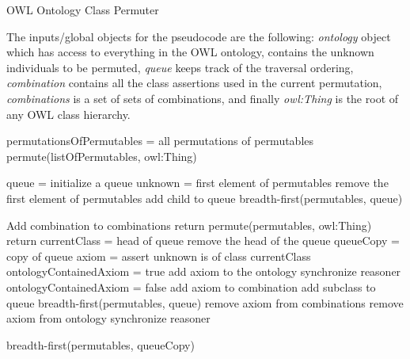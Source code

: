 \documentclass{article}
\begin{document}
\begin{algorithm}
\caption{OWL Ontology Class Permuter}
\State The inputs/global objects for the pseudocode are the following:
\emph{ontology} object which has access to everything
in the OWL ontology,  contains the unknown individuals to be permuted,
\emph{queue} keeps track of the traversal ordering,
\emph{combination} contains all the class assertions
used in the current permutation, \emph{combinations} is a set of sets of
combinations, and finally \emph{owl:Thing} is the root of any OWL class hierarchy.
\begin{algorithmic}[0]
  \State
  \State permutationsOfPermutables = all permutations of permutables
    \State permute(listOfPermutables, owl:Thing)
  \EndFor
  \State
\EndProcedure

  \State queue = initialize a queue
  \State unknown = first element of permutables
  \State remove the first element of permutables
    \State add child to queue
  \EndFor
  \State breadth-first(permutables, queue)
  \State
\EndProcedure

      \State Add combination to combinations
    \EndIf
    \State return
    \State permute(permutables, owl:Thing)
    \State return
  \EndIf
  \State
  \State currentClass = head of queue
  \State remove the head of the queue
  \State queueCopy = copy of queue
  \State axiom = assert unknown is of class currentClass
  \State ontologyContainedAxiom = true
  \State
    \State add axiom to the ontology
    \State synchronize reasoner
    \State ontologyContainedAxiom = false
    \State
      \State add axiom to combination
      \State
          \State add subclass to queue
        \EndIf
      \EndFor
      \State
      \State breadth-first(permutables, queue)
      \State remove axiom from combinations
    \EndIf
  \State
    \State remove axiom from ontology
    \State synchronize reasoner
  \EndIf

  \State breadth-first(permutables, queueCopy)

\EndProcedure
\end{algorithmic}
\end{algorithm}
\end{document}
